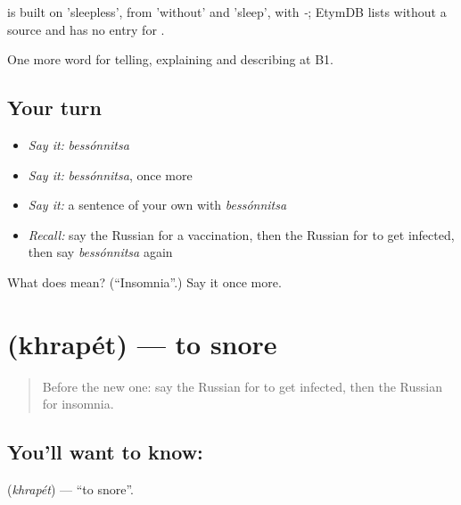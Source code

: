 \begin{cousinweb}
\emph{} is built on \emph{} 'sleepless', from \emph{} 'without' and \emph{} 'sleep', with \emph{-}; EtymDB lists \emph{} without a source and has no entry for \emph{}.
\end{cousinweb}

\begin{grammarlens}[title={What you've built}]
One more word for telling, explaining and describing at B1.
\end{grammarlens}

\subsection*{Your turn}
\begin{itemize}
\raggedright
  \item \emph{Say it:} \emph{bessónnitsa}
  \item \emph{Say it:} \emph{bessónnitsa}, once more
  \item \emph{Say it:} a sentence of your own with \emph{bessónnitsa}
  \item \emph{Recall:} say the Russian for a vaccination, then the Russian for to get infected, then say \emph{bessónnitsa} again
\end{itemize}

\begin{tcolorbox}[breakable,colback=teal!4,colframe=teal!35!black,title={Before you move on}]
What does  mean? (\textquotedblleft{}Insomnia\textquotedblright{}.) Say it once more.
\end{tcolorbox}
\section[\texorpdfstring{\ru{храпеть} (khrapét)}{храпеть (khrapét)}]{ (khrapét) — to snore}

\label{lesson:RU-C488-khrapet}



\begin{quote}
Before the new one: say the Russian for to get infected, then the Russian for insomnia.
\end{quote}

\subsection*{You'll want to know: }
\textbf{} (\emph{khrapét}) — \textquotedblleft{}to snore\textquotedblright{}.


